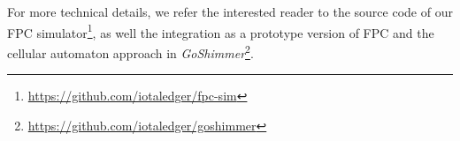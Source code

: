 \documentclass[../main.tex]{subfiles}
\begin{document}
For more technical details, we refer the interested reader to the source code of our FPC simulator\footnote{\url{https://github.com/iotaledger/fpc-sim}}, as well the integration as a prototype version of FPC and the cellular automaton approach in \emph{GoShimmer}\footnote{\url{https://github.com/iotaledger/goshimmer}}. 
\end{document}
